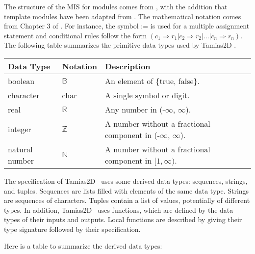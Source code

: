 \documentclass[12pt]{article}
\newcommand{\progname}{Tamias2D }
\begin{document}
The structure of the MIS for modules comes from \citet{HoffmanAndStrooper1995} ,
with the addition that template modules have been adapted from
\cite{GhezziEtAl2003} .  The mathematical notation comes from Chapter 3 of
\citet{HoffmanAndStrooper1995} .  
For instance, the symbol := is used for a
multiple assignment statement and conditional rules follow the form $(c_1
\Rightarrow r_1 | c_2 \Rightarrow r_2 | ... | c_n \Rightarrow r_n )$.\\

The following table summarizes the primitive data types used by \progname. 
\begin{center}
\renewcommand*{\arraystretch}{1.2}
\noindent  \begin{longtable}{l l p{10.5cm}} 
\toprule 
\textbf{Data Type} & \textbf{Notation} & \textbf{Description} \\ 
\midrule
boolean & $\mathbb{B}$ & An element of \{true, false\}. \\
character & char & A single symbol or digit. \\
real & $\mathbb{R}$ & Any number in (-$\infty$, $\infty$). \\
integer & $\mathbb{Z}$ & A number without a fractional
  component in (-$\infty$, $\infty$). \\
natural number & $\mathbb{N}$ & A number without a fractional
  component in $[1, \infty)$. \\
\bottomrule
\end{longtable}
\end{center} 

The specification of \progname \ uses some derived data types: sequences, strings, and tuples. Sequences are lists filled with elements of the same data type. Strings
are sequences of characters. Tuples contain a list of values, potentially of different types. In addition, \progname \ uses functions, which
are defined by the data types of their inputs and outputs. Local functions are described by giving their type signature followed by their specification.

Here is a table to summarize the derived data types:
\end{document}
